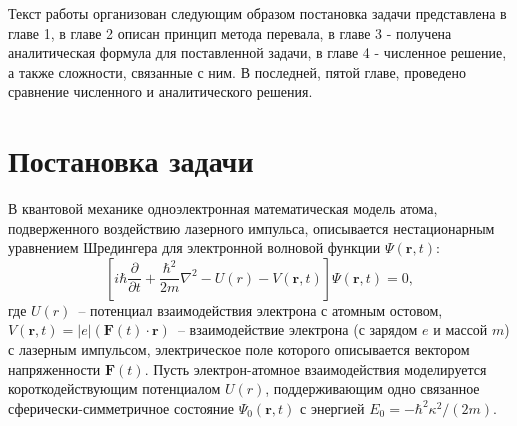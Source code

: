 \documentclass[%
bachelor,    %
natbib,      %
subf,        %
href,        %
colorlinks,  %
]{disser}
\newcommand{\sectionbreak}{\clearpage}
\newcommand{\vF}{\mathbf{F}}
\newcommand{\vr}{\mathbf{r}}
\begin{document}
Текст работы организован следующим образом постановка задачи представлена в главе 1, в главе 2 описан принцип метода перевала, в главе 3 - получена аналитическая формула для поставленной задачи, в главе 4 - численное решение, а также сложности, связанные с ним. В последней, пятой главе, проведено сравнение численного и аналитического решения. 
\sectionbreak


\section{Постановка задачи}

В квантовой механике одноэлектронная математическая модель атома, подверженного воздействию
лазерного импульса, описывается нестационарным уравнением Шредингера для электронной волновой функции $\Psi(\vr,t)$:
\begin{equation}
\label{TDSE}
\left[i\hbar\frac{\partial}{\partial t} + \frac{\hbar^2}{2m}\nabla^2 - U(r) - V(\vr,t)\right]\Psi(\vr,t) = 0,
\end{equation}
где $U(r)$~-- потенциал взаимодействия электрона с атомным остовом, $V(\vr,t)=|e|(\vF(t)\cdot\vr)$~-- взаимодействие электрона (с зарядом $e$ и массой $m$) с лазерным импульсом, электрическое поле которого описывается вектором напряженности $\vF(t)$.\cite{7} Пусть электрон-атомное взаимодействия моделируется короткодействующим потенциалом $U(r)$, поддерживающим одно связанное сферически-симметричное состояние $\Psi_0(\vr,t)$ с энергией $E_0=-\hbar^2\kappa^2/(2m)$.
\end{document}
